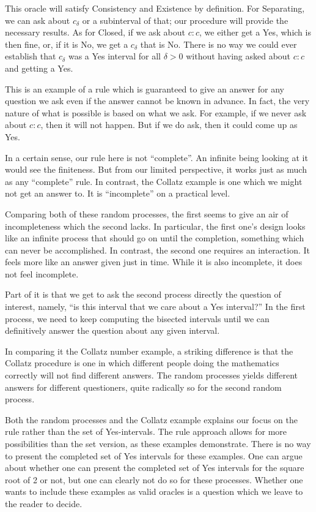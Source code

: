 \documentclass[12pt]{article}
\begin{document}
This oracle will satisfy Consistency and Existence by definition. For Separating, we can ask about $c_\delta$ or a subinterval of that; our procedure will provide the necessary results.  As for Closed, if we ask about $c:c$, we either get a Yes, which is then fine, or, if it is No, we get a $c_\delta$ that is No. There is no way we could ever establish that $c_\delta$ was a Yes interval for all $\delta >0$ without having asked about $c:c$ and getting a Yes. 

This is an example of a rule which is guaranteed to give an answer for any question we ask even if the answer cannot be known in advance. In fact, the very nature of what is possible is based on what we ask. For example, if we never ask about  $c:c$, then it will not happen. But if we do ask, then it could come up as Yes. 

In a certain sense, our rule here is not ``complete''. An infinite being looking at it would see the finiteness. But from our limited perspective, it works just as much as any ``complete'' rule. In contrast, the Collatz example is one which we might not get an answer to. It is ``incomplete'' on a practical level. 

Comparing both of these random processes, the first seems to give an air of incompleteness which the second lacks. In particular, the first one's design looks like an infinite process that should go on until the completion, something which can never be accomplished. In contrast, the second one requires an interaction. It feels more like an answer given just in time. While it is also incomplete, it does not feel incomplete. 
 
Part of it is that we get to ask the second process directly the question of interest, namely, ``is this interval that we care about a Yes interval?'' In the first process, we need to keep computing the bisected intervals until we can definitively answer the question about any given interval. 

In comparing it the Collatz number example, a striking difference is that the Collatz procedure is one in which different people doing the mathematics correctly will not find different answers. The random processes yields different answers for different questioners, quite radically so for the second random process. 

Both the random processes and the Collatz example explains our focus on the rule rather than the set of Yes-intervals. The rule approach allows for more possibilities than the set version, as these examples demonstrate. There is no way to present the completed set of Yes intervals for these examples. One can argue about whether one can present the completed set of Yes intervals for the square root of 2 or not, but one can clearly not do so for these processes. Whether one wants to include these examples as valid oracles is a question which we leave to the reader to decide. 
\end{document}
